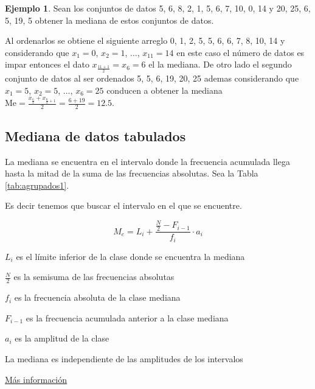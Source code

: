 \documentclass[
  11pt,
]{krantz}
\theoremstyle{definition}
\theoremstyle{definition}
\newtheorem{example}{Ejemplo}[chapter]
\theoremstyle{definition}
\theoremstyle{definition}
\theoremstyle{remark}
\begin{document}
\begin{example}
Sean los conjuntos de datos 5, 6, 8, 2, 1, 5, 6, 7, 10, 0, 14 y 20, 25, 6, 5, 19, 5 obtener la mediana de estos conjuntos de datos.

Al ordenarlos se obtiene el siguiente arreglo 0, 1, 2, 5, 5, 6, 6, 7, 8, 10, 14 y considerando que \(x_1=0\), \(x_2=1\), \(\ldots\), \(x_{11}=14\) en este caso el número de datos es impar entonces el dato \(x_{\frac{11+1}{2}}=x_{6}=6\) el la mediana. De otro lado el segundo conjunto de datos al ser ordenados 5, 5, 6, 19, 20, 25 ademas considerando que \(x_1=5\), \(x_2=5\), \(\ldots\), \(x_6=25\) conducen a obtener la mediana \(\text{Me}=\frac{x_{\frac{6}{2}}+x_{\frac{6}{2}+1}}{2}=\frac{6+19}{2}=12.5\).
\end{example}

\hypertarget{mediana-de-datos-tabulados}{%
\subsection{Mediana de datos tabulados}\label{mediana-de-datos-tabulados}}

La mediana se encuentra en el intervalo donde la frecuencia acumulada llega hasta la mitad de la suma de las frecuencias absolutas. Sea la Tabla \ref{tab:agrupados1}.

Es decir tenemos que buscar el intervalo en el que se encuentre.

\[  M_e=L_{i}+\frac{\frac{N}{2}-F_{i-1}}{f_{i}}\cdot a_{i}\]

\(L_{i}\) es el límite inferior de la clase donde se encuentra la mediana

\(\frac{N}{2}\) es la semisuma de las frecuencias absolutas

\(f_{i}\) es la frecuencia absoluta de la clase mediana

\(F_{i-1}\) es la frecuencia acumulada anterior a la clase mediana

\(a_{i}\) es la amplitud de la clase

La mediana es independiente de las amplitudes de los intervalos

\href{https://www.superprof.es/apuntes/escolar/matematicas/estadistica/descriptiva/mediana.html}{Más información}
\end{document}

